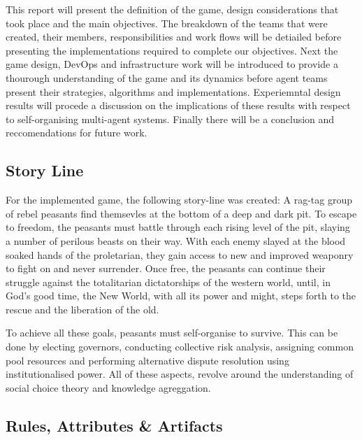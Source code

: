 This report will present the definition of the game, design considerations that took place and the main objectives. The breakdown of the teams that were created, their members, responsibilities and work flows will be detiailed before presenting the implementations required to complete our objectives. Next the game design, DevOps and infrastructure work will be introduced to provide a thourough understanding of the game and its dynamics before agent teams present their strategies, algorithms and implementations. Experiemntal design results will procede a discussion on the implications of these results with respect to self-organising multi-agent systems. Finally there will be a conclusion and reccomendations for future work. 

\subsection{Story Line}\label{sec:story line}

For the implemented game, the following story-line was created: A rag-tag group of rebel peasants find themsevles at the bottom of a deep and dark pit. To escape to freedom, the peasants must battle through each rising level of the pit, slaying a number of perilous beasts on their way. With each enemy slayed at the blood soaked hands of the proletarian, they gain access to new and improved weaponry to fight on and never surrender. Once free, the peasants can continue their struggle against the totalitarian dictatorships of the western world, until, in God's good time, the New World, with all its power and might, steps forth to the rescue and the liberation of the old. \cite{churchill} 

To achieve all these goals, peasants must self-organise to survive. This can be done by electing governors, conducting collective risk analysis, assigning common pool resources and performing alternative dispute resolution using institutionalised power. All of these aspects, revolve around the understanding of social choice theory and knowledge agreggation. 


\subsection{Rules, Attributes \& Artifacts}\label{sec:rules}

